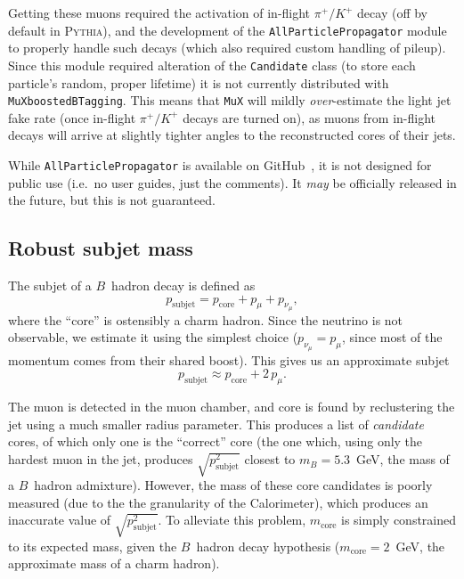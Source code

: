 \documentclass[10pt]{article}
\newcommand{\muXmodFull}{\texttt{MuXboostedBTagging}}
\newcommand{\muXmod}{\texttt{MuX}}
\newcommand{\pSubjet}[1][] {p_{\mathrm{subjet}}^{#1}}
\newcommand{\pCore}[1][]   {p_{\mathrm{core}}^{#1}}
\newcommand{\pMu}[1][]     {p_{\mu}^{#1}}
\newcommand{\pNu}[1][]     {p_{\nu_{\mu}}^{#1}}
\newcommand{\mB}             {m_{B}^{}}
\newcommand{\mCore}[1][]     {m_{\mathrm{core}}^{#1}}
\begin{document}
Getting these muons required the activation of in-flight $\pi^{+}/K^{+}$ decay 
(off by default in \textsc{Pythia}), and the development of the 
\texttt{AllParticlePropagator} module to properly handle such decays 
(which also required custom handling of pileup). Since this module required 
alteration of the \texttt{Candidate} class (to store each particle's random,
proper lifetime) it is not currently distributed with {\muXmodFull}. This means that 
{\muXmod} will mildly \emph{over}-estimate the light jet fake rate (once 
in-flight $\pi^{+}/K^{+}$ decays are turned on), as muons from in-flight decays 
will arrive at slightly tighter angles to the reconstructed cores of their jets.

While \texttt{AllParticlePropagator} is available on
GitHub~\cite{Pedersen:myDelphes}, it is not designed for public use 
(i.e.\ no user guides, just the comments). It \emph{may} be officially released 
in the future, but this is not guaranteed.

\subsection{Robust subjet mass}

The subjet of a $B$~hadron decay is defined as
%
\begin{equation}
\pSubjet=\pCore+\pMu+\pNu,
\end{equation}
%
where the ``core'' is ostensibly a charm hadron.
Since the neutrino is not observable, we estimate it using the
simplest choice ($\pNu=\pMu$, since most of the momentum comes from
their shared boost). This gives us an approximate subjet
%
\begin{equation}
\pSubjet\approx\pCore+2\,\pMu.
\end{equation}
%

The muon is detected in the muon chamber, and core is found by reclustering the 
jet using a much smaller radius parameter. This produces a list of 
\emph{candidate} cores, of which only one is the ``correct'' core (the 
one which, using only the hardest muon in the jet, produces $\sqrt{\pSubjet[2]}$
closest to $\mB=5.3$~GeV, the mass of a $B$~hadron admixture). 
However, the mass of these core candidates is poorly measured (due
to the the granularity of the Calorimeter), which produces an inaccurate
value of $\sqrt{\pSubjet[2]}$. To alleviate this problem, $\mCore$ is simply
constrained to its expected mass, given the $B$~hadron decay hypothesis 
($\mCore=2$~GeV, the approximate mass of a charm hadron). 
\end{document}

